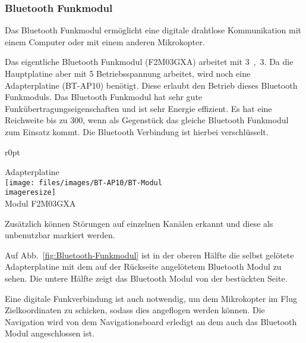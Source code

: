 \subsubsection{Bluetooth Funkmodul}

Das Bluetooth Funkmodul ermöglicht eine digitale drahtlose Kommunikation mit einem Computer
oder mit einem anderen Mikrokopter.

Das eigentliche Bluetooth Funkmodul (F2M03GXA) arbeitet mit \unit{3{,}3}{\volt}.
Da die Hauptplatine aber mit \unit{5}{\volt} Betriebsspannung arbeitet,
wird noch eine Adapterplatine (BT-AP10) benötigt.
Diese erlaubt den Betrieb dieses Bluetooth Funkmoduls.
Das Bluetooth Funkmodul hat sehr gute Funkübertragungseigenschaften
und ist sehr Energie effizient.
Es hat eine Reichweite bis zu \unit{300}{\meter},
wenn als Gegenstück das gleiche Bluetooth Funkmodul zum Einsatz kommt.
Die Bluetooth Verbindung ist hierbei verschlüsselt.

\begin{wrapfigure}{r}{0pt}
\begin{minipage}{7cm}
	\centering
	Adapterplatine~~~~~~~ \\
	\texttt{[image: files/images/BT-AP10/BT-Modul\\imageresize]} \\
	\vspace{-0.2cm}
	Modul F2M03GXA~~~~
	\label{fig:Bluetooth-Funkmodul}
\end{minipage}
\end{wrapfigure}
Zusätzlich können Störungen auf einzelnen Kanälen erkannt
und diese als unbenutzbar markiert werden.

Auf Abb.~\vref{fig:Bluetooth-Funkmodul} ist in der oberen Hälfte
die selbst gelötete Adapterplatine mit dem auf der Rückseite angelötetem
Bluetooth Modul zu sehen.
Die untere Hälfte zeigt das Bluetooth Modul von der bestückten Seite.

Eine digitale Funkverbindung ist auch notwendig, um dem Mikrokopter im Flug
Zielkoordinaten zu schicken, sodass dies angeflogen werden können.
Die Navigation wird von dem Navigationsboard erledigt
an dem auch das Bluetooth Modul angeschlossen ist.
